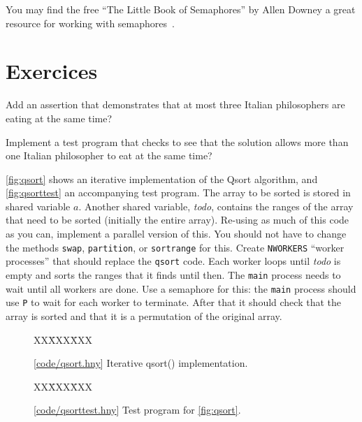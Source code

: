 \documentclass{report}
\newcommand{\harmonysource}[1]{
\begin{tabbing}
XX\=XXX\=XXX\kill
    
\end{tabbing}
}
\newcommand{\harmonylink}[1]{%
[\href{https://www.cs.cornell.edu/home/rvr/harmony/#1}{\underline{#1}}]%
}
\newenvironment{code}{
\tcolorbox
}{
\endtcolorbox
}
\begin{document}
You may find the free ``The Little Book of Semaphores'' by
Allen Downey a great resource for working with semaphores~\cite{Downey09}.

\section*{Exercices}
\begin{problems}
\item Add an assertion that demonstrates that at most three
Italian philosophers are eating at the same time?
\item Implement a test program that checks to see that
the solution allows more than one Italian philosopher to eat at the same time?
\item \label{ex:qsort}
\autoref{fig:qsort} shows an iterative implementation of the Qsort
algorithm, and \autoref{fig:qsorttest} an accompanying test program.
The array to be sorted is stored in  shared variable $a$.
Another shared variable, \textit{todo}, contains the ranges of the
array that need to be sorted (initially the entire array).
Re-using as much of this code as you can, implement a parallel version of
this.  You should not have to change the methods \texttt{swap}, \texttt{partition},
or \texttt{sortrange} for this.  Create \texttt{NWORKERS} ``worker processes''
that should replace the \texttt{qsort} code.  Each worker loops until \textit{todo}
is empty and sorts the ranges that it finds until then.  The \texttt{main}
process needs to wait until all workers are done.  Use a semaphore for this:
the \texttt{main} process should use \texttt{P} to wait for each
worker to terminate.  After that it should check that the array is sorted and
that it is a permutation of the original array.
\end{problems}

\begin{figure}
\begin{code}
\harmonysource{qsort}
\end{code}
\caption{\harmonylink{code/qsort.hny} Iterative qsort() implementation.}
\label{fig:qsort}
\end{figure}

\begin{figure}
\begin{code}
\harmonysource{qsorttest}
\end{code}
\caption{\harmonylink{code/qsorttest.hny} Test program for \autoref{fig:qsort}.}
\label{fig:qsorttest}
\end{figure}
\end{document}
